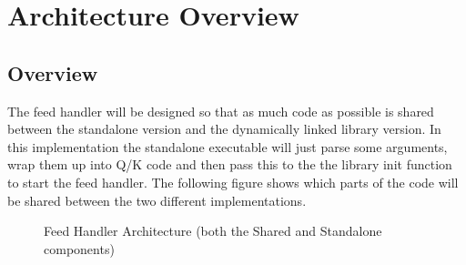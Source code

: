 \chapter{Architecture Overview}

\section{Overview}

The feed handler will be designed so that as much code as possible is shared
between the standalone version and the dynamically linked library version.
In this implementation the standalone executable will just parse some arguments,
wrap them up into Q/K code and then pass this to the the library init function
to start the feed handler. The following figure shows which parts of the code
will be shared between the two different implementations.

 \begin{figure}[H]
 	\centering
 	\caption{Feed Handler Architecture (both the Shared and Standalone components)}
 	\label{usingtheinputresourcepage}
 \end{figure}

